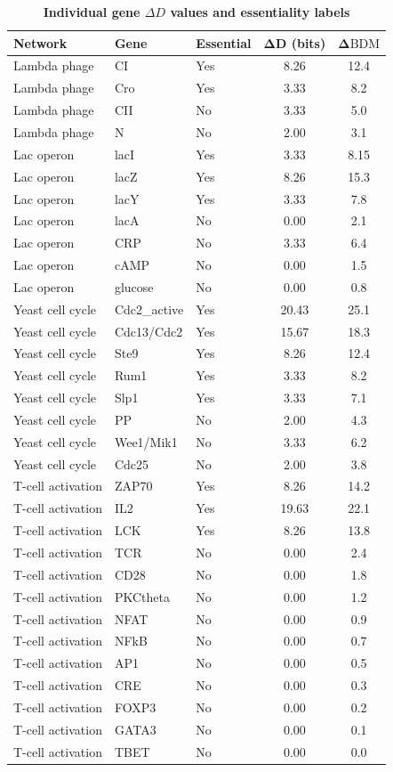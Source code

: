\documentclass[12pt]{article}
\begin{document}
\begin{table}[htbp]
\centering
\caption{\textbf{Individual gene \(\Delta D\) values and essentiality labels}}
\label{tab:deltaD_full}
\begin{tabular}{@{}lllcc@{}}
\toprule
\textbf{Network} & \textbf{Gene} & \textbf{Essential} & \(\boldsymbol{\Delta D}\) (bits) & \(\boldsymbol{\Delta\mathrm{BDM}}\) \\
\midrule
Lambda phage & CI & Yes & 8.26 & 12.4 \\
Lambda phage & Cro & Yes & 3.33 & 8.2 \\
Lambda phage & CII & No & 3.33 & 5.0 \\
Lambda phage & N & No & 2.00 & 3.1 \\
Lac operon & lacI & Yes & 3.33 & 8.15 \\
Lac operon & lacZ & Yes & 8.26 & 15.3 \\
Lac operon & lacY & Yes & 3.33 & 7.8 \\
Lac operon & lacA & No & 0.00 & 2.1 \\
Lac operon & CRP & No & 3.33 & 6.4 \\
Lac operon & cAMP & No & 0.00 & 1.5 \\
Lac operon & glucose & No & 0.00 & 0.8 \\
Yeast cell cycle & Cdc2\_active & Yes & 20.43 & 25.1 \\
Yeast cell cycle & Cdc13/Cdc2 & Yes & 15.67 & 18.3 \\
Yeast cell cycle & Ste9 & Yes & 8.26 & 12.4 \\
Yeast cell cycle & Rum1 & Yes & 3.33 & 8.2 \\
Yeast cell cycle & Slp1 & Yes & 3.33 & 7.1 \\
Yeast cell cycle & PP & No & 2.00 & 4.3 \\
Yeast cell cycle & Wee1/Mik1 & No & 3.33 & 6.2 \\
Yeast cell cycle & Cdc25 & No & 2.00 & 3.8 \\
T-cell activation & ZAP70 & Yes & 8.26 & 14.2 \\
T-cell activation & IL2 & Yes & 19.63 & 22.1 \\
T-cell activation & LCK & Yes & 8.26 & 13.8 \\
T-cell activation & TCR & No & 0.00 & 2.4 \\
T-cell activation & CD28 & No & 0.00 & 1.8 \\
T-cell activation & PKCtheta & No & 0.00 & 1.2 \\
T-cell activation & NFAT & No & 0.00 & 0.9 \\
T-cell activation & NFkB & No & 0.00 & 0.7 \\
T-cell activation & AP1 & No & 0.00 & 0.5 \\
T-cell activation & CRE & No & 0.00 & 0.3 \\
T-cell activation & FOXP3 & No & 0.00 & 0.2 \\
T-cell activation & GATA3 & No & 0.00 & 0.1 \\
T-cell activation & TBET & No & 0.00 & 0.0 \\
\bottomrule
\end{tabular}
\end{table}
\end{document}
